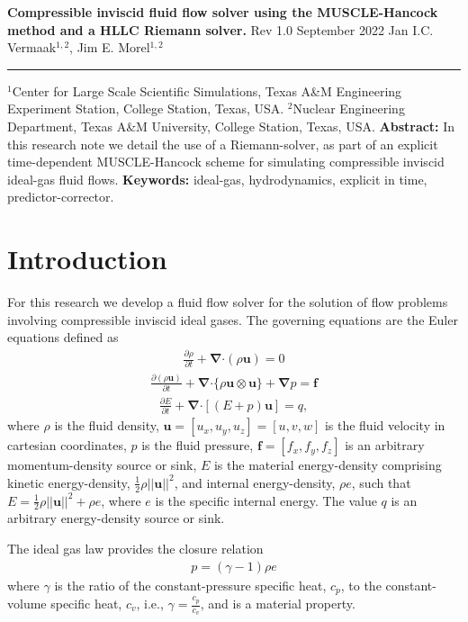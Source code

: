 \documentclass[10pt,letterpaper,notitlepage]{article}
\numberwithin{equation}{section}
\newcommand{\DOCTITLE}{Compressible inviscid fluid flow solver using the MUSCLE-Hancock method and a HLLC Riemann solver.}
\newcommand{\partialderiv}[2]{\frac{\partial #1}{\partial #2}}
\newcommand{\bnabla}{\boldsymbol{\nabla}}
\newcommand{\velocity}{\mathbf{u}}
\newcommand{\dotp}{\boldsymbol{\cdot}}
\newcommand{\beqn}{\begin{equation}\begin{aligned}}
\newcommand{\eeqn}{\end{aligned}\end{equation}}
\begin{document}
\noindent
{\LARGE\textbf{\DOCTITLE}}
\newline
\newline
{\LARGE Rev 1.0 September 2022}
\newline
\newline
\noindent
{\Large Jan I.C. Vermaak$^{1,2}$, Jim E. Morel$^{1,2}$}
\newline
\noindent\rule{\textwidth}{1pt}
{\small $^1$Center for Large Scale Scientific Simulations, Texas A\&M Engineering Experiment Station, College Station, Texas, USA.}
\newline\noindent
{\small $^2$Nuclear Engineering Department, Texas A\&M University, College Station, Texas, USA.}
\newline
\newline
\textbf{Abstract:}\newline\noindent
In this research note we detail the use of a Riemann-solver, as part of an explicit time-dependent MUSCLE-Hancock scheme for simulating compressible inviscid ideal-gas fluid flows.
\newline
\newline\noindent
{\small
\textbf{Keywords:} ideal-gas, hydrodynamics, explicit in time, predictor-corrector.}

\section{Introduction}
For this research we develop a fluid flow solver for the solution of flow problems involving compressible inviscid ideal gases. The governing equations are the Euler equations defined as
\beqn 
\partialderiv{\rho}{t} + \bnabla \dotp (\rho \velocity) = 0
\eeqn 
\beqn 
\partialderiv{(\rho\velocity)}{t} + \bnabla \dotp \{ \rho \velocity \otimes \velocity\}  + \bnabla p = \mathbf{f}
\eeqn 
\beqn 
\partialderiv{E}{t} + \bnabla \dotp [(E + p)\velocity] = q,
\eeqn 
where $\rho$ is the fluid density, $\velocity = [u_x, u_y, u_z] =[u,v,w]$ is the fluid velocity in cartesian coordinates, $p$ is the fluid pressure, $\mathbf{f} = [f_x,f_y,f_z]$ is an arbitrary momentum-density source or sink, $E$ is the material energy-density comprising kinetic energy-density, $\frac{1}{2} \rho ||\velocity||^2$, and internal energy-density, $\rho e$, such that $E = \frac{1}{2} \rho ||\velocity||^2 + \rho e$, where $e$ is the specific internal energy. The value $q$ is an arbitrary energy-density source or sink.

The ideal gas law provides the closure relation
\beqn 
p = (\gamma - 1) \rho e
\eeqn 
where $\gamma$ is the ratio of the constant-pressure specific heat, $c_p$, to the constant-volume specific heat, $c_v$, i.e., $\gamma = \frac{c_p}{c_v}$, and is a material property.
\end{document}
